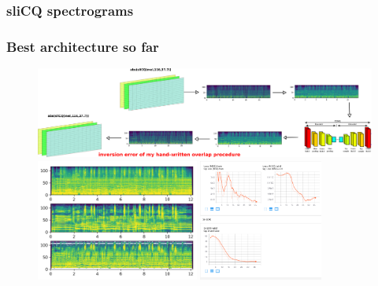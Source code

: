 \documentclass[usenames,dvipsnames]{beamer}
\begin{document}
\begin{frame}
	\frametitle{sliCQ spectrograms}
	\begin{figure}
	\end{figure}
\end{frame}

\begin{frame}
	\frametitle{Best architecture so far}
	\begin{figure}
		\includegraphics[height=3cm]{./bestarch.png}
		\includegraphics[height=4cm]{./best1.png}
		\includegraphics[height=4cm]{./best2.png}
	\end{figure}
\end{frame}
\end{document}
